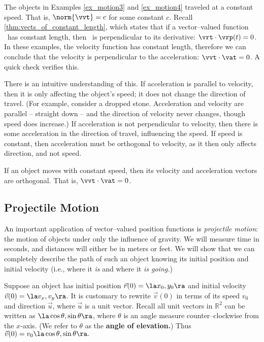 The objects in Examples \ref{ex_motion3} and \ref{ex_motion4} traveled at a constant speed. That is, $\norm{\vvt} = c$ for some constant $c$. Recall \autoref{thm:vects_of_constant_length}, which states that if a vector--valued function \vrt\ has constant length, then \vrt\ is perpendicular to its derivative: $\vrt\cdot\vrp(t) = 0$. In these examples, the velocity function has constant length, therefore we can conclude that the velocity is perpendicular to the acceleration: $\vvt\cdot\vat = 0$. A quick check verifies this.

There is an intuitive understanding of this. If acceleration is parallel to velocity, then it is only affecting the object's speed; it does not change the direction of travel. (For example, consider a dropped stone. Acceleration and velocity are parallel -- straight down -- and the direction of velocity never changes, though speed does increase.) If acceleration is not perpendicular to velocity, then there is some acceleration in the direction of travel, influencing the speed. If speed is constant, then acceleration must be orthogonal to velocity, as it then only affects direction, and not speed.

{If an object moves with constant speed, then its velocity and acceleration vectors are orthogonal. That is, $\vvt\cdot\vat=0$.
}


\subsection*{Projectile Motion}

An important application of vector--valued position functions is \emph{projectile motion}: the motion of objects under only the influence of gravity. We will measure time in seconds, and distances will either be in meters or feet. We will show that we can completely describe the path of such an object knowing its initial position and initial velocity (i.e., where it \emph{is} and where it \emph{is going.})

Suppose an object has initial position $\vec r(0) = \la x_0,y_0\ra$ and initial velocity $\vec v(0) = \la v_x,v_y\ra$. It is customary to rewrite $\vec v(0)$ in terms of its speed $v_0$ and direction $\vec u$, where $\vec u$ is a unit vector. Recall all unit vectors in $\mathbb{R}^2$ can be written as $\la \cos \theta,\sin \theta\ra$, where $\theta$ is an angle measure counter--clockwise from the $x$-axis. (We refer to $\theta$ as the \textbf{angle of elevation.}) Thus $\vec v(0) = v_0\la \cos \theta,\sin \theta\ra.$ 

